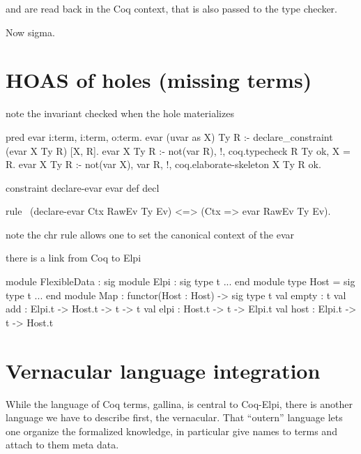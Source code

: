 \documentclass[a4paper, 11pt]{book}
\begin{document}
 and  are read back in the
 Coq context, that is also
passed to the type checker.

Now sigma.


\section{HOAS of holes (missing terms)}

note the invariant checked when the hole materializes

\begin{elpicode}
pred evar i:term, i:term, o:term. %
evar (uvar as X) Ty R :- declare_constraint (evar X Ty R) [X, R].
evar X Ty R :- not(var R), !, coq.typecheck R Ty ok, X = R.
evar X Ty R :- not(var X), var R, !, coq.elaborate-skeleton X Ty R ok.
 
constraint declare-evar evar def decl {

rule \ (declare-evar Ctx RawEv Ty Ev) <=> (Ctx => evar RawEv Ty Ev).
   
}
\end{elpicode}

note the chr rule allows one to set the canonical context of the evar

there is a link from Coq to Elpi

\begin{ocamlcode}
module FlexibleData : sig
  module Elpi : sig type t ... end
  module type Host = sig type t ... end
  module Map : functor(Host : Host) -> sig
    type t
    val empty : t
    val add : Elpi.t -> Host.t -> t -> t
    val elpi   : Host.t -> t -> Elpi.t
    val host : Elpi.t -> t -> Host.t
\end{ocamlcode}



\section{Vernacular language integration}

While the language of Coq terms, gallina, is central to Coq-Elpi, there is another
language we have to describe first, the vernacular. That ``outern'' language
lets one organize the formalized knowledge, in particular give names to terms
and attach to them meta data.
\end{document}
